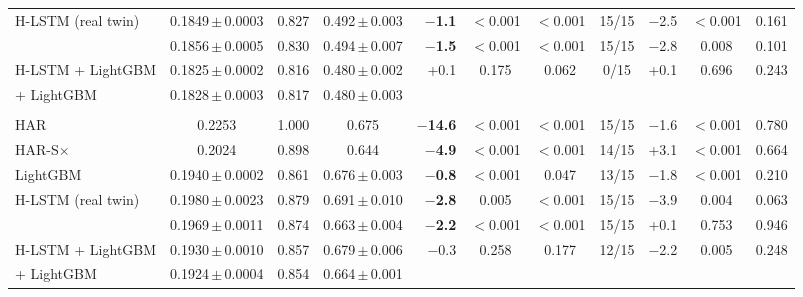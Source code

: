 \begin{tabular}{@{}lcccrcccrcc@{}}
H-LSTM (real twin) & 0.1849\,$\pm$\,0.0003 & 0.827 & 0.492\,$\pm$\,0.003 & \textbf{$-$1.1} & $<$0.001 & $<$0.001 & 15/15 & $-$2.5 & $<$0.001 & 0.161 \\
\HQ{} & 0.1856\,$\pm$\,0.0005 & 0.830 & 0.494\,$\pm$\,0.007 & \textbf{$-$1.5} & $<$0.001 & $<$0.001 & 15/15 & $-$2.8 & 0.008 & 0.101 \\
H-LSTM + LightGBM & 0.1825\,$\pm$\,0.0002 & 0.816 & 0.480\,$\pm$\,0.002 & +0.1 & 0.175 & 0.062 & 0/15 & +0.1 & 0.696 & 0.243 \\
\HQ{} + LightGBM & 0.1828\,$\pm$\,0.0003 & 0.817 & 0.480\,$\pm$\,0.003 &  &  &  &  &  &  &  \\
\addlinespace[2pt]
\multicolumn{11}{@{}l}{\emph{Daily bars} (8,100 test forecasts, 5 runs)} \\
HAR & 0.2253 & 1.000 & 0.675 & \textbf{$-$14.6} & $<$0.001 & $<$0.001 & 15/15 & $-$1.6 & $<$0.001 & 0.780 \\
HAR-S$\times$ & 0.2024 & 0.898 & 0.644 & \textbf{$-$4.9} & $<$0.001 & $<$0.001 & 14/15 & +3.1 & $<$0.001 & 0.664 \\
LightGBM & 0.1940\,$\pm$\,0.0002 & 0.861 & 0.676\,$\pm$\,0.003 & \textbf{$-$0.8} & $<$0.001 & 0.047 & 13/15 & $-$1.8 & $<$0.001 & 0.210 \\
H-LSTM (real twin) & 0.1980\,$\pm$\,0.0023 & 0.879 & 0.691\,$\pm$\,0.010 & \textbf{$-$2.8} & 0.005 & $<$0.001 & 15/15 & $-$3.9 & 0.004 & 0.063 \\
\HQ{} & 0.1969\,$\pm$\,0.0011 & 0.874 & 0.663\,$\pm$\,0.004 & \textbf{$-$2.2} & $<$0.001 & $<$0.001 & 15/15 & +0.1 & 0.753 & 0.946 \\
H-LSTM + LightGBM & 0.1930\,$\pm$\,0.0010 & 0.857 & 0.679\,$\pm$\,0.006 & $-$0.3 & 0.258 & 0.177 & 12/15 & $-$2.2 & 0.005 & 0.248 \\
\HQ{} + LightGBM & 0.1924\,$\pm$\,0.0004 & 0.854 & 0.664\,$\pm$\,0.001 &  &  &  &  &  &  &  \\
\bottomrule
\end{tabular}

